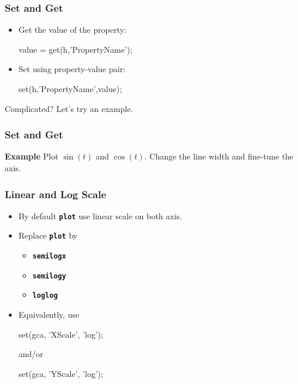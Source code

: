 \documentclass[compress]{beamer}  %
\newcommand{\tttbf}[1]{\texttt{\textbf{#1}}} %
\begin{document}
\begin{frame}[fragile]
\frametitle{Set and Get}
\begin{itemize}
    \item Get the value of the property:
          \begin{matlabcode}[frame=none]
          value = get(h,'PropertyName');
          \end{matlabcode}
          
    \item Set using property-value pair:
          \begin{matlabcode}[frame=none]
          set(h,'PropertyName',value);
          \end{matlabcode}
\end{itemize}
Complicated? Let's try an example.
\end{frame}
\begin{frame}[fragile]
\frametitle{Set and Get}
\textbf{Example} 
Plot $\sin(t)$ and $\cos(t)$. Change the line width and fine-tune the axis.
\setcounter{subfigure}{0}
\begin{figure}
    \centering
\end{figure}

\end{frame}
\begin{frame}[fragile]
\frametitle{Linear and Log Scale}
\begin{itemize}[<+->]
    \item By default \tttbf{plot} use linear scale on both axis.
    
    \item Replace \tttbf{plot} by
    \begin{itemize}
        \item \tttbf{semilogx}
        \item \tttbf{semilogy}
        \item \tttbf{loglog}
    \end{itemize}        
    
    \item Equivalently, use 
          \begin{matlabcode}[numbers=none,frame=none]
          set(gca, 'XScale', 'log');
          \end{matlabcode}
          and/or
          \begin{matlabcode}[numbers=none,frame=none]
          set(gca, 'YScale', 'log');
          \end{matlabcode}
\end{itemize}

\end{frame}
\end{document}
